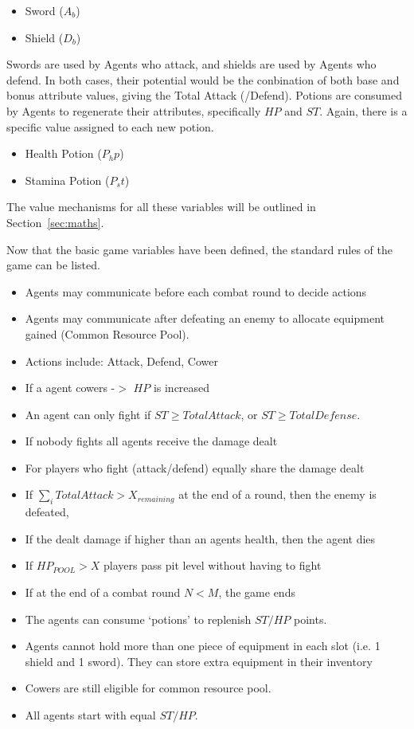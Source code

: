 \begin{itemize}
    \item Sword ($A_b$)
    \item Shield ($D_b$)
\end{itemize}

Swords are used by Agents who attack, and shields are used by Agents who defend. In both cases, their potential would be the conbination of both base and bonus attribute values, giving the Total Attack (/Defend). Potions are consumed by Agents to regenerate their attributes, specifically $HP$ and $ST$. Again, there is a specific value assigned to each new potion. 

\begin{itemize}
    \item Health Potion ($P_hp$)
    \item Stamina Potion ($P_st$)
\end{itemize}

The value mechanisms for all these variables will be outlined in Section~\ref{sec:maths}. 

Now that the basic game variables have been defined, the standard rules of the game can be listed. 

\begin{itemize}
    \item Agents may communicate before each combat round to decide actions
    \item Agents may communicate after defeating an enemy to allocate equipment gained (Common Resource Pool). 
    \item Actions include: Attack, Defend, Cower
    \item If a agent cowers -$>$ $HP$ is increased
    \item An agent can only fight if $ST \geq TotalAttack$, or $ST \geq TotalDefense$.
    \item If nobody fights all agents receive the damage dealt
    \item For players who fight (attack/defend) equally share the damage dealt
    \item If $\sum_{i} TotalAttack > X_{remaining}$ at the end of a round, then the enemy is defeated, 
    \item If the dealt damage if higher than an agents health, then the agent dies
    \item If $HP_{POOL} > X$ players pass pit level without having to fight
    \item If at the end of a combat round $N<M$, the game ends 
    \item The agents can consume `potions' to replenish $ST/HP$ points.
    \item Agents cannot hold more than one piece of equipment in each slot (i.e. 1 shield and 1 sword). They can store extra equipment in their inventory
    \item Cowers are still eligible for common resource pool.  
    \item All agents start with equal $ST/HP$. 
\end{itemize}

